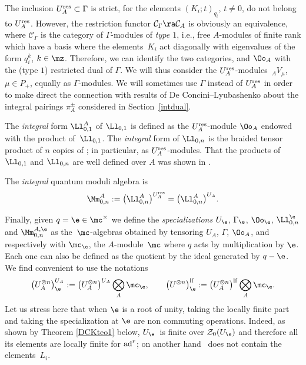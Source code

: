 The inclusion $U_A^{\rm res}\subset \Gamma$ is strict, for the elements $(K_i; t)_{q_i}$, $t\ne 0$, do not belong to $U_A^{\rm res}$. However, the restriction functor $\mathcal{C}_\Gamma \ra\mathcal{C}_A$ is obviously an equivalence, where $\mathcal{C}_\Gamma$ is the category of $\Gamma$-modules of {\it type $1$}, i.e., free $A$-modules of finite rank which have a basis where the elements~$K_i$ act diagonally with eigenvalues of the form $q_i^k$, $k\in \mz$. Therefore, we can identify the two categories, and $\Oo_A$ with the (type $1$) restricted dual of $\Gamma$. We will thus consider the $U_A^{\rm res}$-modules~${}_AV_\mu$, $\mu\in P_+$, equally as $\Gamma$-modules. We will sometimes use $\Gamma$ instead of $U_A^{\rm res}$ in order to make direct the connection with results of De Concini--Lyubashenko about the integral pairings $\pi_A^\pm$ considered in Section~\ref{intdual}.

The {\it integral} form $\Ll_{0,1}^A$ of $\Ll_{0,1}$ is defined as the $U_A^{\rm res}$-module $\Oo_A$ endowed with the product of~$\Ll_{0,1}$. The {\it integral} form  of $\Ll_{0,n}$ is the braided tensor product of $n$ copies of ; in particular,  as $U_A^{\rm res}$-modules. That the products of $\Ll_{0,1}$ and $\Ll_{0,n}$ are well defined over $A$ was shown in \cite[Proposition~6.9]{BR}.

The {\it integral} quantum moduli algebra is
\[\Mm_{0,n}^A := \big(\Ll_{0,n}^A\big)^{U_A^{\rm res}} = \big(\Ll_{0,n}^A\big)^{U_A}.\]

Finally, given $q=\e\in \mc^{\times}$ we define the {\it specializations} $U_\e$, $\Gamma_\e$, $\Oo_\e$, $\Ll_{0,n}^{\e}$ and $\Mm_{0,n}^{A,\e}$ as the~$\mc$-algebras obtained by tensoring $U_A$, $\Gamma$, $\Oo_A$,  and  respectively with $\mc_\e$, the $A$-module~$\mc$ where $q$ acts by multiplication by $\e$. Each one can also be defined as the quotient by the ideal generated by $q-\e$. We find convenient to use the notations
\begin{equation}\label{notambig0}
\big(U_A^{\otimes n}\big)^{U_A}_\e:= \big(U_A^{\otimes n}\big)^{U_A}\bigotimes_A \mc_\e,\qquad \big(U^{\otimes n}\big)^{\rm lf}_\e:= \big(U_A^{\otimes n}\big)^{\rm lf}\bigotimes_A \mc_\e .
\end{equation}
Let us stress here that when $\e$ is a root of unity, taking the locally finite part and taking the specialization at $\e$ are non commuting operations. Indeed, as shown by Theorem \ref{DCKteo1} below, $U_\e$~is finite over $\mathcal{Z}_0(U_\e)$ and therefore all its elements are locally finite for ${\rm ad}^r$; on another hand~ does not contain the elements~$L_i$.

